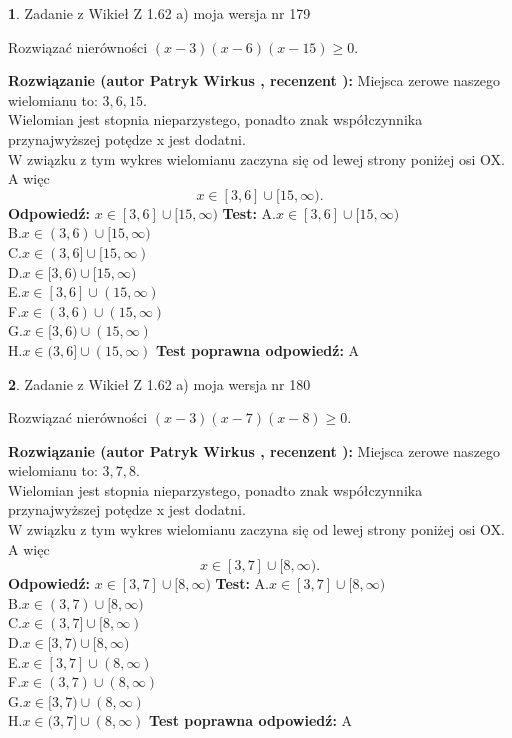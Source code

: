 \documentclass[12pt, a4paper]{article}
\theoremstyle{definition} %
\newtheorem{zad}{}
\newcommand{\zadStart}[1]{\begin{zad}#1\newline}
\newcommand{\zadStop}{\end{zad}}
\newcommand{\rozwStart}[2]{\noindent \textbf{Rozwiązanie (autor #1 , recenzent #2): }\newline}
\newcommand{\rozwStop}{\newline}
\newcommand{\odpStart}{\noindent \textbf{Odpowiedź:}\newline}
\newcommand{\odpStop}{\newline}
\newcommand{\testStart}{\noindent \textbf{Test:}\newline}
\newcommand{\testStop}{\newline}
\newcommand{\kluczStart}{\noindent \textbf{Test poprawna odpowiedź:}\newline}
\newcommand{\kluczStop}{\newline}
\begin{document}
\zadStart{Zadanie z Wikieł Z 1.62 a) moja wersja nr 179}

Rozwiązać nierówności $(x-3)(x-6)(x-15)\ge0$.
\zadStop
\rozwStart{Patryk Wirkus}{}
Miejsca zerowe naszego wielomianu to: $3, 6, 15$.\\
Wielomian jest stopnia nieparzystego, ponadto znak współczynnika przy\linebreak najwyższej potędze x jest dodatni.\\ W związku z tym wykres wielomianu zaczyna się od lewej strony poniżej osi OX. A więc $$x \in [3,6] \cup [15,\infty).$$
\rozwStop
\odpStart
$x \in [3,6] \cup [15,\infty)$
\odpStop
\testStart
A.$x \in [3,6] \cup [15,\infty)$\\
B.$x \in (3,6) \cup [15,\infty)$\\
C.$x \in (3,6] \cup [15,\infty)$\\
D.$x \in [3,6) \cup [15,\infty)$\\
E.$x \in [3,6] \cup (15,\infty)$\\
F.$x \in (3,6) \cup (15,\infty)$\\
G.$x \in [3,6) \cup (15,\infty)$\\
H.$x \in (3,6] \cup (15,\infty)$
\testStop
\kluczStart
A
\kluczStop



\zadStart{Zadanie z Wikieł Z 1.62 a) moja wersja nr 180}

Rozwiązać nierówności $(x-3)(x-7)(x-8)\ge0$.
\zadStop
\rozwStart{Patryk Wirkus}{}
Miejsca zerowe naszego wielomianu to: $3, 7, 8$.\\
Wielomian jest stopnia nieparzystego, ponadto znak współczynnika przy\linebreak najwyższej potędze x jest dodatni.\\ W związku z tym wykres wielomianu zaczyna się od lewej strony poniżej osi OX. A więc $$x \in [3,7] \cup [8,\infty).$$
\rozwStop
\odpStart
$x \in [3,7] \cup [8,\infty)$
\odpStop
\testStart
A.$x \in [3,7] \cup [8,\infty)$\\
B.$x \in (3,7) \cup [8,\infty)$\\
C.$x \in (3,7] \cup [8,\infty)$\\
D.$x \in [3,7) \cup [8,\infty)$\\
E.$x \in [3,7] \cup (8,\infty)$\\
F.$x \in (3,7) \cup (8,\infty)$\\
G.$x \in [3,7) \cup (8,\infty)$\\
H.$x \in (3,7] \cup (8,\infty)$
\testStop
\kluczStart
A
\kluczStop
\end{document}
